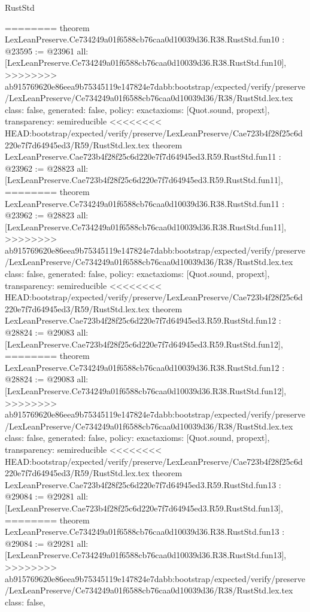 \begin{lexlean}{RustStd}
\begin{coremodule}
{\begin{coremodule}
{{{{{{{{{{{{{========
theorem LexLeanPreserve.Ce734249a01f6588cb76caa0d10039d36.R38.RustStd.fun10 : @23595 := @23961 {
  all: [LexLeanPreserve.Ce734249a01f6588cb76caa0d10039d36.R38.RustStd.fun10],
>>>>>>>> ab915769620e86eea9b75345119e147824e7dabb:bootstrap/expected/verify/preserve/LexLeanPreserve/Ce734249a01f6588cb76caa0d10039d36/R38/RustStd.lex.tex
  class: false,
  generated: false,
  policy: exact{axioms: [Quot.sound, propext]},
  transparency: semireducible
}
<<<<<<<< HEAD:bootstrap/expected/verify/preserve/LexLeanPreserve/Cae723b4f28f25c6d220e7f7d64945ed3/R59/RustStd.lex.tex
theorem LexLeanPreserve.Cae723b4f28f25c6d220e7f7d64945ed3.R59.RustStd.fun11 : @23962 := @28823 {
  all: [LexLeanPreserve.Cae723b4f28f25c6d220e7f7d64945ed3.R59.RustStd.fun11],
========
theorem LexLeanPreserve.Ce734249a01f6588cb76caa0d10039d36.R38.RustStd.fun11 : @23962 := @28823 {
  all: [LexLeanPreserve.Ce734249a01f6588cb76caa0d10039d36.R38.RustStd.fun11],
>>>>>>>> ab915769620e86eea9b75345119e147824e7dabb:bootstrap/expected/verify/preserve/LexLeanPreserve/Ce734249a01f6588cb76caa0d10039d36/R38/RustStd.lex.tex
  class: false,
  generated: false,
  policy: exact{axioms: [Quot.sound, propext]},
  transparency: semireducible
}
<<<<<<<< HEAD:bootstrap/expected/verify/preserve/LexLeanPreserve/Cae723b4f28f25c6d220e7f7d64945ed3/R59/RustStd.lex.tex
theorem LexLeanPreserve.Cae723b4f28f25c6d220e7f7d64945ed3.R59.RustStd.fun12 : @28824 := @29083 {
  all: [LexLeanPreserve.Cae723b4f28f25c6d220e7f7d64945ed3.R59.RustStd.fun12],
========
theorem LexLeanPreserve.Ce734249a01f6588cb76caa0d10039d36.R38.RustStd.fun12 : @28824 := @29083 {
  all: [LexLeanPreserve.Ce734249a01f6588cb76caa0d10039d36.R38.RustStd.fun12],
>>>>>>>> ab915769620e86eea9b75345119e147824e7dabb:bootstrap/expected/verify/preserve/LexLeanPreserve/Ce734249a01f6588cb76caa0d10039d36/R38/RustStd.lex.tex
  class: false,
  generated: false,
  policy: exact{axioms: [Quot.sound, propext]},
  transparency: semireducible
}
<<<<<<<< HEAD:bootstrap/expected/verify/preserve/LexLeanPreserve/Cae723b4f28f25c6d220e7f7d64945ed3/R59/RustStd.lex.tex
theorem LexLeanPreserve.Cae723b4f28f25c6d220e7f7d64945ed3.R59.RustStd.fun13 : @29084 := @29281 {
  all: [LexLeanPreserve.Cae723b4f28f25c6d220e7f7d64945ed3.R59.RustStd.fun13],
========
theorem LexLeanPreserve.Ce734249a01f6588cb76caa0d10039d36.R38.RustStd.fun13 : @29084 := @29281 {
  all: [LexLeanPreserve.Ce734249a01f6588cb76caa0d10039d36.R38.RustStd.fun13],
>>>>>>>> ab915769620e86eea9b75345119e147824e7dabb:bootstrap/expected/verify/preserve/LexLeanPreserve/Ce734249a01f6588cb76caa0d10039d36/R38/RustStd.lex.tex
  class: false,
}}}}}}}}}}}}}}}}}
\end{coremodule}}
\end{coremodule}
\end{lexlean}

